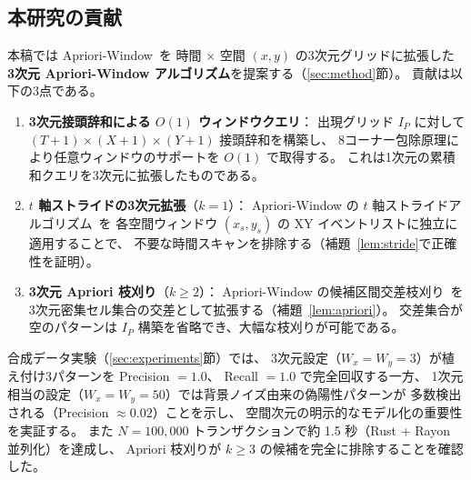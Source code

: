 \subsection{本研究の貢献}

本稿では Apriori-Window~\cite{aprioriwindow}を
時間 $\times$ 空間 $(x, y)$ の3次元グリッドに拡張した
\textbf{3次元 Apriori-Window アルゴリズム}を提案する（\ref{sec:method}節）。
貢献は以下の3点である。

\begin{enumerate}
\item \textbf{3次元接頭辞和による $O(1)$ ウィンドウクエリ}：
出現グリッド $I_P$ に対して $(T{+}1) \times (X{+}1) \times (Y{+}1)$ 接頭辞和を構築し、
8コーナー包除原理により任意ウィンドウのサポートを $O(1)$ で取得する。
これは1次元の累積和クエリを3次元に拡張したものである。

\item \textbf{$t$ 軸ストライドの3次元拡張}（$k = 1$）：
Apriori-Window の $t$ 軸ストライドアルゴリズム~\cite{aprioriwindow}を
各空間ウィンドウ $(x_s, y_s)$ の XY イベントリストに独立に適用することで、
不要な時間スキャンを排除する（補題~\ref{lem:stride}で正確性を証明）。

\item \textbf{3次元 Apriori 枝刈り}（$k \geq 2$）：
Apriori-Window の候補区間交差枝刈り~\cite{aprioriwindow}を
3次元密集セル集合の交差として拡張する（補題~\ref{lem:apriori}）。
交差集合が空のパターンは $I_P$ 構築を省略でき、大幅な枝刈りが可能である。
\end{enumerate}

合成データ実験（\ref{sec:experiments}節）では、
3次元設定（$W_x = W_y = 3$）が植え付け3パターンを Precision $= 1.0$、
Recall $= 1.0$ で完全回収する一方、
1次元相当の設定（$W_x = W_y = 50$）では背景ノイズ由来の偽陽性パターンが
多数検出される（Precision $\approx 0.02$）ことを示し、
空間次元の明示的なモデル化の重要性を実証する。
また $N = 100{,}000$ トランザクションで約 1.5 秒（Rust + Rayon 並列化）を達成し、
Apriori 枝刈りが $k \geq 3$ の候補を完全に排除することを確認した。
